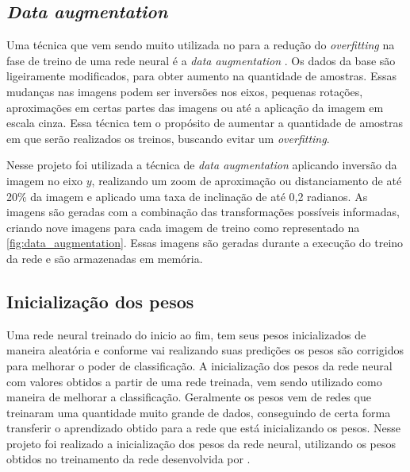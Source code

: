 \subsection{\textit{Data augmentation}}
Uma técnica que vem sendo muito utilizada no para a redução do \textit{overfitting} na fase de treino de uma rede neural é a \textit{data augmentation} \cite{cui2015data}. 
Os dados da base são ligeiramente modificados, para obter aumento na quantidade de amostras.
Essas mudanças nas imagens podem ser inversões nos eixos, pequenas rotações, aproximações em certas partes das imagens ou até a aplicação da imagem em escala cinza.
Essa técnica tem o propósito de aumentar a quantidade de amostras em que serão realizados os treinos, buscando evitar um \textit{overfitting}.
\par Nesse projeto foi utilizada a técnica de \textit{data augmentation} aplicando inversão da imagem no eixo $y$, realizando um zoom de aproximação ou distanciamento de até 20\% da imagem e aplicado uma taxa de inclinação de até 0,2 radianos. As imagens são geradas com a combinação das transformações possíveis informadas, criando nove imagens para cada imagem de treino como representado na \autoref{fig:data_augmentation}. Essas imagens são geradas durante a execução do treino da rede e são armazenadas em memória.


\subsection{Inicialização dos pesos}
Uma rede neural treinado do inicio ao fim, tem seus pesos inicializados de maneira aleatória e conforme vai realizando suas predições os pesos são corrigidos para melhorar o poder de classificação. A inicialização dos pesos da rede neural com valores obtidos a partir de uma rede treinada, vem sendo utilizado como maneira de melhorar a classificação. 
Geralmente os pesos vem de redes que treinaram uma quantidade muito grande de dados, conseguindo de certa forma transferir o aprendizado obtido para a rede que está inicializando os pesos.
Nesse projeto foi realizado a inicialização dos pesos da rede neural, utilizando os pesos obtidos no treinamento da rede desenvolvida por .




